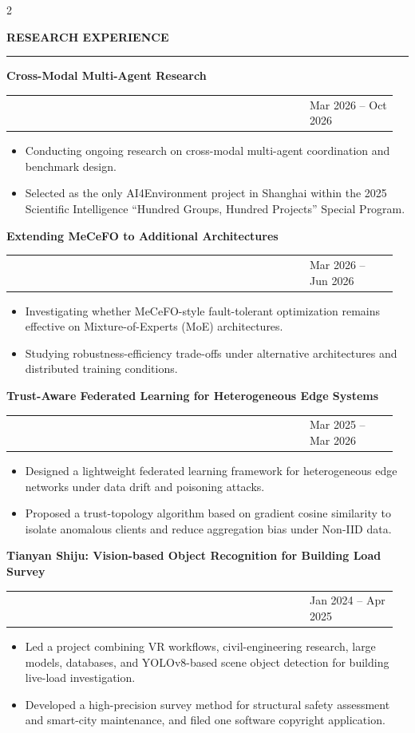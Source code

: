 \documentclass[10pt,letterpaper]{article}
\makeatletter
\newcommand{\sectiontitle}[1]{%
  \vspace{12pt}
  {\large\bfseries\textcolor{darkcol}{\MakeUppercase{#1}}}\par
  \textcolor{maincol}{\rule{0.18\linewidth}{1.5pt}}\par
  \vspace{4pt}
}
\newcommand{\entry}[4]{%
  {\normalsize\bfseries #1}\par
  \begin{tabular*}{\linewidth}{@{}>{\RaggedRight\arraybackslash}p{0.74\linewidth}@{\extracolsep{\fill}}>{\RaggedLeft\arraybackslash}p{0.22\linewidth}@{}}
    {\small\textcolor{darkcol}{#3}} & {\footnotesize\textcolor{maincol}{#2}} \\
  \end{tabular*}\par
  {\small\RaggedRight #4\par}\vspace{6pt}
}
\newcommand{\bullets}[1]{%
  \RaggedRight
  \begin{itemize}[leftmargin=1.1em,topsep=1.8pt,itemsep=2.2pt,parsep=0pt,partopsep=0pt]
    #1
  \end{itemize}
}
\makeatother
\begin{document}
\begin{paracol}{2}
\begin{rightcolumn}
\sectiontitle{Research Experience}
\entry
  {Cross-Modal Multi-Agent Research}{Mar 2026 -- Oct 2026}
  {Scientific Intelligence ``Hundred Groups, Hundred Projects''}
  {\bullets{
    \item Conducting ongoing research on cross-modal multi-agent coordination and benchmark design.
    \item Selected as the only AI4Environment project in Shanghai within the 2025 Scientific Intelligence ``Hundred Groups, Hundred Projects'' Special Program.
  }}

\entry
  {Extending MeCeFO to Additional Architectures}{Mar 2026 -- Jun 2026}
  {Follow-up study to MeCeFO (NeurIPS 2025)}
  {\bullets{
    \item Investigating whether MeCeFO-style fault-tolerant optimization remains effective on Mixture-of-Experts (MoE) architectures.
    \item Studying robustness-efficiency trade-offs under alternative architectures and distributed training conditions.
  }}

\entry
  {Trust-Aware Federated Learning for Heterogeneous Edge Systems}{Mar 2025 -- Mar 2026}
  {Core Member}
  {\bullets{
    \item Designed a lightweight federated learning framework for heterogeneous edge networks under data drift and poisoning attacks.
    \item Proposed a trust-topology algorithm based on gradient cosine similarity to isolate anomalous clients and reduce aggregation bias under Non-IID data.
  }}

\entry
  {Tianyan Shiju: Vision-based Object Recognition for Building Load Survey}{Jan 2024 -- Apr 2025}
  {Project Lead}
  {\bullets{
    \item Led a project combining VR workflows, civil-engineering research, large models, databases, and YOLOv8-based scene object detection for building live-load investigation.
    \item Developed a high-precision survey method for structural safety assessment and smart-city maintenance, and filed one software copyright application.
  }}

\end{rightcolumn}
\end{paracol}

\vspace*{\fill}
\noindent{}
\end{document}
